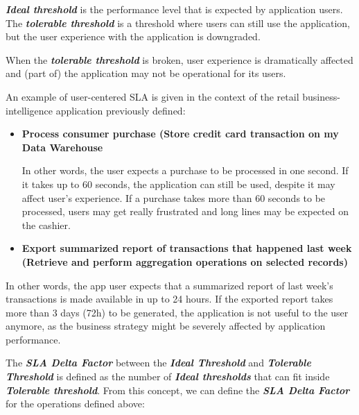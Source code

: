 \textbf{\textit{Ideal threshold}} is the performance level that is expected by application users. The \textbf{\textit{tolerable threshold}} is a threshold where users can still use the application, but the user experience with the application is downgraded.

When the \textbf{\textit{tolerable threshold}} is broken, user experience is dramatically affected and (part of) the application may not be operational for its users.

An example of user-centered SLA is given in the context of the retail business-intelligence application previously defined: 

\begin{itemize}
\item{ 
\textbf{Process consumer purchase (Store credit card transaction on my Data Warehouse}
}

In other words, the user expects a purchase to be processed in one second. If it takes up to 60 seconds, the application can still be used, despite it may affect user's experience. If a purchase takes more than 60 seconds to be processed, users may get really frustrated and long lines may be expected on the cashier.

\item{
\textbf{Export summarized report of transactions that happened last week (Retrieve and perform aggregation operations on selected records) }
}
\end{itemize}
     
In other words, the app user expects that a summarized report of last week's transactions is made available in up to 24 hours. If the exported report takes more than 3 days (72h) to be generated, the application is not useful to the user anymore, as the business strategy might be severely affected by application performance.

The \textbf{\textit{SLA Delta Factor}} between the \textbf{\textit{Ideal Threshold}} and \textbf{\textit{Tolerable Threshold}} is defined as the number of \textbf{\textit{Ideal thresholds}} that can fit inside \textbf{\textit{Tolerable threshold}}. From this concept, we can define the \textbf{\textit{SLA Delta Factor}} for the operations defined above:

